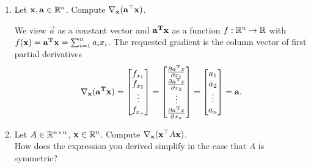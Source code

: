 \documentclass{article}
\begin{document}
\begin{enumerate}[label=(\alph*)]
    \item Let $\mathbf x, \mathbf a \in \mathbb{R}^n$. Compute $\nabla_\mathbf x(\mathbf a^{\top}\mathbf x)$.
    \begin{mdframed}
      We view $\vec a$ as a constant vector and $\mathbf a^{\mathbf{T}} \mathbf x$ as a function
      $f:\mathbb{R}^n \rightarrow \mathbb{R}$ with $f(\mathbf x) = \mathbf a^{\mathbf{T}} \mathbf x = \sum_{i=1}^n a_ix_i$. The
      requested gradient is the column vector of first partial derivatives
      \begin{align*}
        \nabla_\mathbf x(\mathbf a^{\mathbf{T}} \mathbf x)
        = \begin{bmatrix}f_{x_1}\\f_{x_2}\\ \vdots\\f_{x_n}\end{bmatrix}
        = \begin{bmatrix}\frac{\partial a^{\mathbf{T}} x}{\partial x_1}\\ \frac{\partial a^{\mathbf{T}} x}{\partial x_2}\\ \vdots\\\frac{\partial a^{\mathbf{T}} x}{\partial x_n}\\\end{bmatrix}
        = \begin{bmatrix}a_1\\a_2\\ \vdots\\a_n\end{bmatrix}
        = \mathbf a.
      \end{align*}
    \end{mdframed}

  \item Let $A \in \mathbb{R}^{n\times n}$, $\mathbf x \in \mathbb{R}^n$. Compute $\nabla_\mathbf x(\mathbf x^{\top} A\mathbf x)$. \\
    How does the expression you derived simplify in the case that $A$ is symmetric? \\


\end{enumerate}
\end{document}

